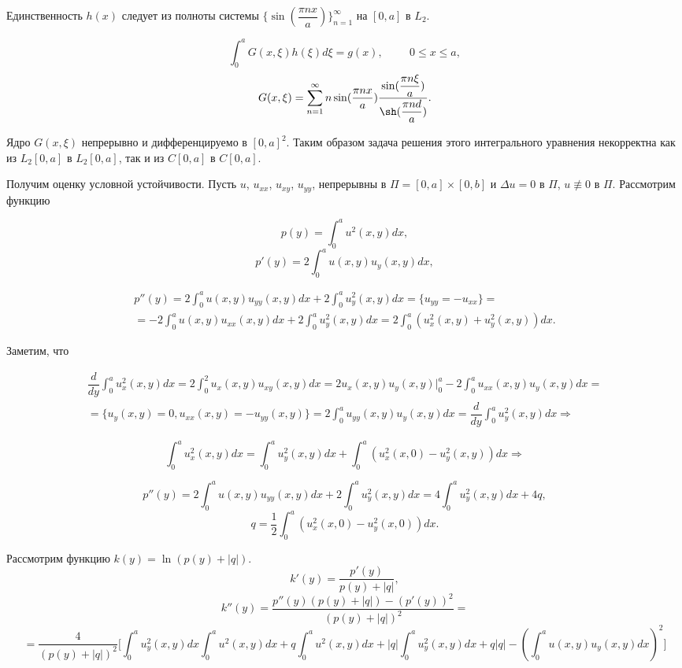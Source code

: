 \documentclass{article}
\begin{document}
Единственность $h(x)$ следует из полноты системы $\{\sin (\dfrac{\pi n x}{a})\}_{n=1}^{\infty}$ на $[0,a]$ в $L_2$.


\[
\int_0^a G(x,\xi) h(\xi) d \xi = g(x), \hspace{1cm} 0 \leqslant x \leqslant a,
\]
\[
G(x,\xi) =  \sum_{n=1}^{\infty} n \sin (\dfrac{\pi n x}{a})  \dfrac{\sin (\dfrac{\pi n \xi}{a})}{\sh (\dfrac{\pi n d}{a})}.
\]

Ядро $G(x,\xi)$ непрерывно и дифференцируемо в $[0,a]^2$. Таким образом задача решения этого интегрального уравнения некорректна как из $L_2[0,a]$ в $L_2[0,a]$, так и из $C[0,a]$ в $C[0,a]$.

Получим оценку условной устойчивости. Пусть $u$, $u_{xx}$, $u_{xy}$, $u_{yy}$, непрерывны в $\Pi = [0,a] \times [0,b]$ и $\Delta u = 0$ в $\Pi$, $u \nequiv 0$ в $\Pi$.
Рассмотрим функцию

\[
p(y) = \int_0^a u^2 (x,y) dx,
\]
\[
p'(y) = 2 \int_0^a u (x,y) u_y(x,y) dx,
\]

\begin{multline*}
p''(y) = 2 \int_0^a u (x,y) u_{yy}(x,y) dx + 2 \int_0^a u_y^2 (x,y) dx = \{ u_{yy} = - u_{xx} \} = \\
= -2 \int_0^a u (x,y) u_{xx}(x,y)dx + 2 \int_0^a u_y^2(x,y)dx 
=  2 \int_0^a (u_x^2(x,y) + u_y^2(x,y))dx.
\end{multline*}

Заметим, что

\begin{multline*}
\dfrac{d}{dy} \int_0^a u_x^2(x,y)dx =
 2 \int_0^2 u_x(x,y) u_{xy}(x,y) dx = 
 2 u_x(x,y) u_y(x,y) \bigg|_0^a - 2 \int_0^a u_{xx}(x,y) u_y(x,y) dx =\\
= \{ u_y(x,y) = 0, u_{xx}(x,y) = -u_{yy}(x,y) \} =
 2 \int_0^a u_{yy}(x,y) u_y(x,y) dx = \dfrac{d}{dy} \int_0^a u_y^2(x,y)dx \Rightarrow
\end{multline*}

\[
\int_0^a u_x^2(x,y)dx = \int_0^a u_y^2(x,y) dx + \int_0^a (u_x^2(x,0) - u_y^2(x,y)) dx \Rightarrow
\]

\[
p''(y) = 2 \int_0^a u(x,y) u_{yy}(x,y)dx + 2 \int_0^a u_y^2(x,y) dx = 4 \int_0^a u_y^2(x,y) dx + 4q,
\]
\[
q = \dfrac{1}{2} \int_0^a (u_x^2(x,0) - u_y^2(x,0))dx.
\]

Рассмотрим функцию $k(y) = \ln (p(y) + |q|)$.
\[
k'(y) = \dfrac{p'(y)}{p(y) + |q|}, 
\]
\[
k''(y) = \dfrac{p''(y) (p(y) + |q|) - (p'(y))^2}{(p(y) + |q|)^2} = 
\]
\[
=\dfrac{4}{(p(y) + |q|)^2} \bigg[ \int_0^a u_y^2(x,y) dx \int_0^a u^2(x,y)dx + q \int_0^a u^2(x,y) dx + |q| \int_0^a u_y^2(x,y)dx + q |q| - (\int_0^a u(x,y) u _y(x,y)dx)^2 \bigg]
\]
\end{document}
